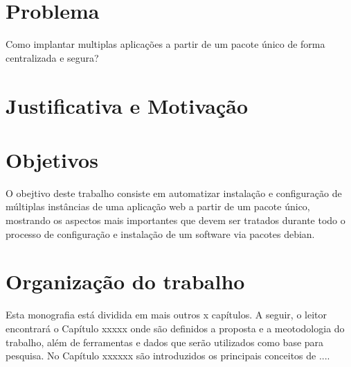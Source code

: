 \section{Problema}
%

Como implantar multiplas aplicações a partir de um pacote único de
forma centralizada e segura?

\section{Justificativa e Motivação}
\label{sec:motivacao}


\section{Objetivos}

%

O obejtivo deste trabalho consiste em automatizar instalação e configuração de
múltiplas instâncias de uma aplicação web a partir de um pacote único, mostrando os aspectos
mais importantes que devem ser tratados durante todo o processo de configuração
e instalação de um software via pacotes debian.

%


\section{Organização do trabalho}

%

Esta monografia está dividida em mais outros x capítulos. A seguir, o leitor
encontrará o Capítulo xxxxx onde são definidos a proposta e
a meotodologia do trabalho, além de ferramentas e dados que serão utilizados
como base para pesquisa. No Capítulo xxxxxx
são introduzidos os principais conceitos de  ....

